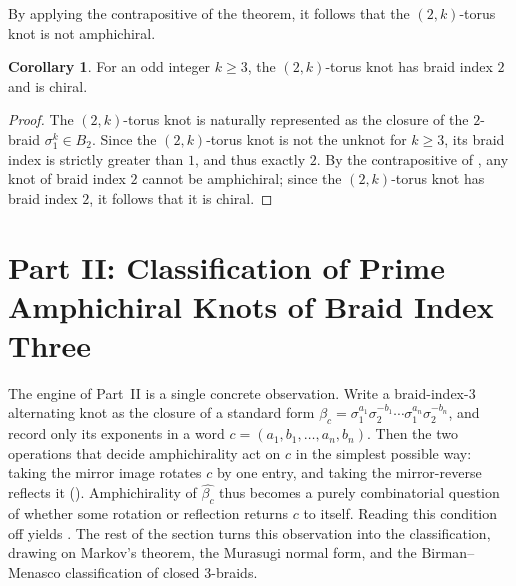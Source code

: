 \documentclass[11pt]{article}
\theoremstyle{definition}
\newtheorem{corollary}[corollary]{Corollary}
\begin{document}
By applying the contrapositive of the theorem, it follows that the $(2,k)$-torus knot is not amphichiral.

\begin{corollary}\label{cor:torus-chiral}
For an odd integer $k \ge 3$, the $(2,k)$-torus knot has braid index $2$ and is
chiral.
\end{corollary}

\begin{proof}
The $(2,k)$-torus knot is naturally represented as the closure of the $2$-braid
$\sigma_1^k\in B_2$. Since the $(2,k)$-torus knot is not the unknot for $k\ge 3$,
its braid index is strictly greater than $1$, and thus exactly $2$. By the
contrapositive of , any knot of braid index $2$ cannot be
amphichiral; since the $(2,k)$-torus knot has braid index $2$, it follows that
it is chiral.
\end{proof}

\section{Part II: Classification of Prime Amphichiral Knots of Braid Index Three}\label{sec:partII}

\noindent The engine of Part~II is a single concrete observation. Write a braid-index-$3$
alternating knot as the closure of a standard form
$\beta_c=\sigma_1^{a_1}\sigma_2^{-b_1}\cdots\sigma_1^{a_n}\sigma_2^{-b_n}$, and record only
its exponents in a word $c=(a_1,b_1,\dots,a_n,b_n)$. Then the two operations that
decide amphichirality act on $c$ in the simplest possible way: taking the mirror image
rotates $c$ by one entry, and taking the mirror-reverse reflects it
(). Amphichirality of $\widehat{\beta_c}$ thus becomes a purely
combinatorial question of whether some rotation or reflection returns $c$ to
itself. Reading this condition off yields . The rest of the section
turns this observation into the classification, drawing on Markov's theorem, the Murasugi
normal form, and the Birman--Menasco classification of closed $3$-braids.
\end{document}
